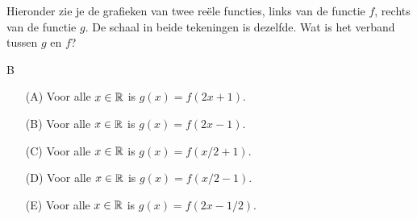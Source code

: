 \documentclass{ximera}
\begin{document}
\newpage
\begin{oefening2}

Hieronder zie je de grafieken van twee re\"ele functies, links van de functie $f$, rechts van de functie $g$.
De schaal in beide tekeningen is dezelfde. Wat is het verband tussen $g$ en $f$?
\begin{opl}
B
\end{opl}

\begin{enumerate}
\item [(A)]Voor alle $x\in\mathbb{R}$ is $g(x)=f(2x+1)$.
\item [(B)] Voor alle $x\in\mathbb{R}$ is $g(x)=f(2x-1)$.
\item [(C)] Voor alle $x\in\mathbb{R}$ is $g(x)=f(x/2+1)$.
\item [(D)] Voor alle $x\in\mathbb{R}$ is $g(x)=f(x/2-1)$.
\item [(E)] Voor alle $x\in\mathbb{R}$ is $g(x)=f(2x-1/2)$.
\end{enumerate}

\end{oefening2}
\end{document}
